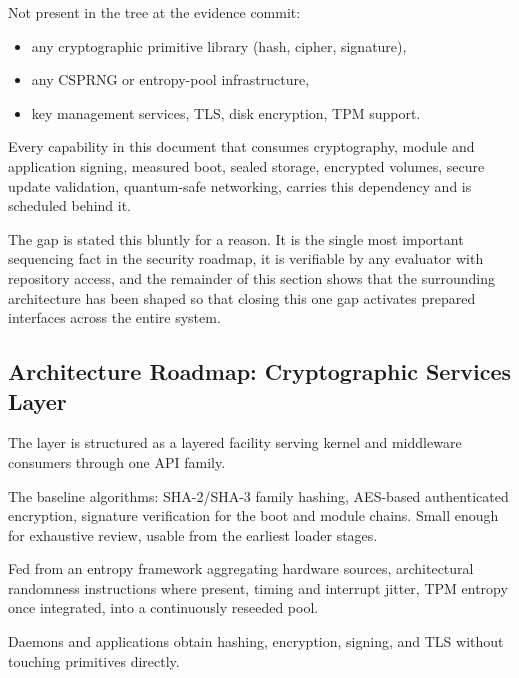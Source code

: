 \documentclass[11pt, a4paper]{article}
\begin{document}
Not present in the tree at the evidence commit:

\begin{itemize}
\item any cryptographic primitive library (hash, cipher, signature),
\item any CSPRNG or entropy-pool infrastructure,
\item key management services, TLS, disk encryption, TPM support.
\end{itemize}

Every capability in this document that consumes cryptography, module and application signing, measured boot, sealed storage, encrypted volumes, secure update validation, quantum-safe networking, carries this dependency and is scheduled behind it.

The gap is stated this bluntly for a reason. It is the single most important sequencing fact in the security roadmap, it is verifiable by any evaluator with repository access, and the remainder of this section shows that the surrounding architecture has been shaped so that closing this one gap activates prepared interfaces across the entire system.

\subsection{Architecture Roadmap: Cryptographic Services Layer}\label{architecture-roadmap-crypto-services}

The layer is structured as a layered facility serving kernel and middleware consumers through one API family.

\begin{description}[leftmargin=0pt,style=unboxed]
\item[Kernel primitive core.] The baseline algorithms: SHA-2/SHA-3 family hashing, AES-based authenticated encryption, signature verification for the boot and module chains. Small enough for exhaustive review, usable from the earliest loader stages.
\item[Kernel CSPRNG.] Fed from an entropy framework aggregating hardware sources, architectural randomness instructions where present, timing and interrupt jitter, TPM entropy once integrated, into a continuously reseeded pool.
\item[Middleware cryptographic services API.] Daemons and applications obtain hashing, encryption, signing, and TLS without touching primitives directly.
\end{description}
\end{document}
